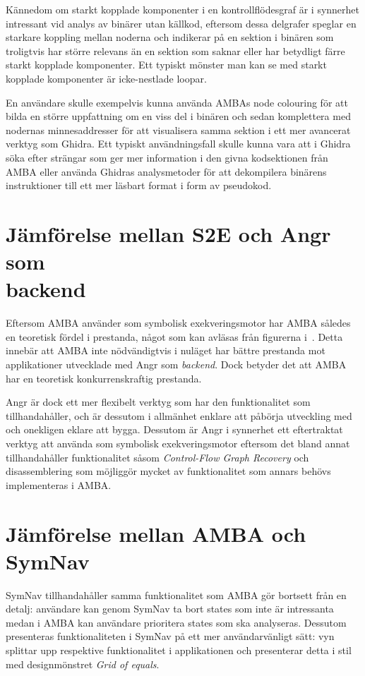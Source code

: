 Kännedom om starkt kopplade komponenter i en kontrollflödesgraf är i synnerhet
intressant vid analys av binärer utan källkod, eftersom dessa delgrafer speglar
en starkare koppling mellan noderna och indikerar på en sektion i binären som
troligtvis har större relevans än en sektion som saknar eller har betydligt
färre starkt kopplade komponenter. Ett typiskt mönster man kan se med starkt
kopplade komponenter är icke-nestlade loopar.

En användare skulle exempelvis kunna använda AMBAs node colouring för att bilda
en större uppfattning om en viss del i binären och sedan komplettera med
nodernas minnesaddresser för att visualisera samma sektion i ett mer avancerat
verktyg som Ghidra. Ett typiskt användningsfall skulle kunna vara att i Ghidra
söka efter strängar som ger mer information i den givna kodsektionen från AMBA
eller använda Ghidras analysmetoder för att dekompilera binärens instruktioner
till ett mer läsbart format i form av pseudokod.

\section{Jämförelse mellan S2E och Angr som \\ backend} Eftersom AMBA använder
\stoe{} som symbolisk exekveringsmotor har AMBA således en teoretisk fördel i
prestanda, något som kan avläsas från figurerna
i~\cite[Figur~1-5]{systematic_comparison_symbex}. Detta innebär att AMBA inte nödvändigtvis i
nuläget har bättre prestanda mot applikationer utvecklade med Angr som
\emph{backend}. Dock betyder det att AMBA har en teoretisk konkurrenskraftig
prestanda.

Angr är dock ett mer flexibelt verktyg som har den funktionalitet som \stoe{}
tillhandahåller, och är dessutom i allmänhet enklare att påbörja utveckling med
och onekligen eklare att bygga. Dessutom är Angr i synnerhet ett eftertraktat
verktyg att använda som symbolisk exekveringsmotor eftersom det bland annat
tillhandahåller funktionalitet såsom \emph{Control-Flow Graph Recovery} och
disassemblering som möjliggör mycket av funktionalitet som annars behövs 
implementeras i AMBA.

\section{Jämförelse mellan AMBA och SymNav} SymNav tillhandahåller samma
funktionalitet som AMBA gör bortsett från en detalj: användare kan genom SymNav
ta bort states som inte är intressanta medan i AMBA kan användare prioritera
states som ska analyseras. Dessutom presenteras funktionaliteten i SymNav på ett
mer användarvänligt sätt: vyn splittar upp respektive funktionalitet i
applikationen och presenterar detta i stil med designmönstret \emph{Grid of
    equals}.

